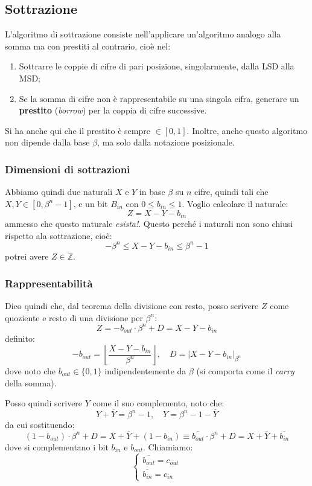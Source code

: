 \documentclass[a4paper,11pt]{article}
\begin{document}


\subsection{Sottrazione}
L'algoritmo di sottrazione consiste nell'applicare un'algoritmo analogo alla somma ma con prestiti al contrario, cioè nel:
\begin{enumerate}
	\item Sottrarre le coppie di cifre di pari posizione, singolarmente, dalla LSD alla MSD;
	\item Se la somma di cifre non è rappresentabile su una singola cifra, generare un \textbf{prestito} (\textit{borrow}) per la coppia di cifre successive.
\end{enumerate}

Si ha anche qui che il prestito è sempre $\in [0, 1]$.
Inoltre, anche questo algoritmo non dipende dalla base $\beta$, ma solo dalla notazione posizionale.

\subsubsection{Dimensioni di sottrazioni}
Abbiamo quindi due naturali $X$ e $Y$ in base $\beta$ su $n$ cifre, quindi tali che $X, Y \in [0, \beta^n - 1]$, e un bit $B_{in}$ con $0 \leq b_{in} \leq 1$.
Voglio calcolare il naturale:
$$
Z = X - Y - b_{in}
$$
ammesso che questo naturale \textit{esista!}.
Questo perché i naturali non sono chiusi rispetto ala sottrazione, cioè:
$$ - \beta^n \leq X-Y-b_{in} \leq \beta^n -1$$
potrei avere $Z \in \mathbb{Z}$.

\subsubsection{Rappresentabilità}
Dico quindi che, dal teorema della divisione con resto, posso scrivere $Z$ come quoziente e resto di una divisione per $\beta^n$:
$$ Z = -b_{out} \cdot \beta^n + D = X - Y - b_{in} $$
definito:
$$
-b_{out} = \left\lfloor \frac{X-Y-b_{in}}{\beta^n} \right\rfloor, \quad D = |X-Y-b_{in}|_{\beta^n}
$$
dove noto che $b_{out} \in \{0 ,1\}$ indipendentemente da $\beta$ (si comporta come il \textit{carry} della somma). 

Posso quindi scrivere $Y$ come il suo complemento, noto che:
$$ 
Y + \overline{Y} = \beta^n - 1, \quad Y = \beta^n - 1 - \overline{Y}
$$
da cui sostituendo:
$$
(1 - b_{out}) \cdot \beta^n + D = X + \overline{Y} + (1-b_{in}) \equiv \overline{b_{out}} \cdot \beta^n + D = X + \overline{Y} + \overline{b_{in}}
$$
dove si complementano i bit $b_{in}$ e $b_{out}$.
Chiamiamo:
\[
	\begin{cases}
		\overline{b_{out}} = c_{out} \\ 
		\overline{b_{in}} = c_{in}
	\end{cases}
\]
\end{document}
